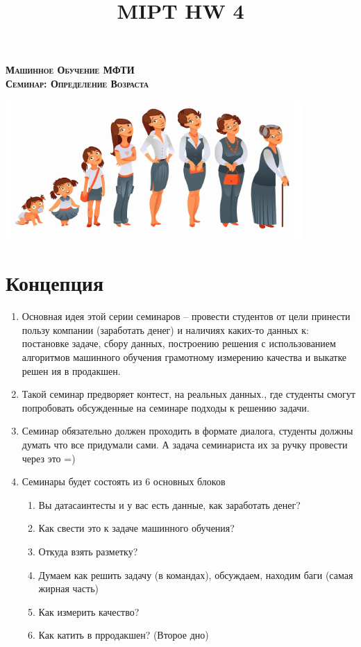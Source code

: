 \documentclass[a4paper, 12pt]{article}
\author{}
\date{}
\title{MIPT HW 4}
\begin{document}
  \begin{center}
    \textsc{\textbf{
    	{\Large Машинное Обучение МФТИ \\
        \vspace{0.5cm}
    	Семинар: Определение Возраста}}}
  \end{center}

\begin{center}
	\includegraphics[scale=0.9]{front_page}
\end{center}

\section*{Концепция}
	\begin{enumerate}
		\item Основная идея этой серии семинаров -- провести студентов от цели принести пользу компании (заработать денег) и наличиях каких-то данных к: постановке задаче, сбору данных, построению решения с использованием алгоритмов машинного обучения грамотному измерению качества и выкатке решен ия в продакшен. 
		
		\item Такой семинар предворяет контест, на реальных данных., где студенты смогут попробовать обсужденные на семинаре подходы к решению задачи. 
		
		\item Семинар обязательно должен проходить в формате диалога, студенты должны думать что все придумали сами. А задача семинариста их за ручку провести через это =)
		\item Семинары будет состоять из 6 основных блоков
		\begin{enumerate}
			\item Вы датасаинтесты и у вас есть данные, как заработать денег?
			\item Как свести это к задаче машинного обучения? 
			\item Откуда взять разметку?
			\item Думаем как решить задачу (в командах), обсуждаем, находим баги (самая жирная часть)
			\item Как измерить качество?
			\item Как катить в прродакшен?  (Второе дно) 
		\end{enumerate}
	\end{enumerate}
\end{document}
